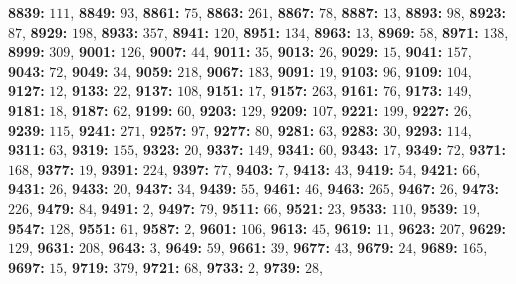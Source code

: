 \textsf{\bfseries 8839:} $111$, \textsf{\bfseries 8849:} $93$, \textsf{\bfseries 8861:} $75$, \textsf{\bfseries 8863:} $261$, \textsf{\bfseries 8867:} $78$, \textsf{\bfseries 8887:} $13$, \textsf{\bfseries 8893:} $98$, \textsf{\bfseries 8923:} $87$, \textsf{\bfseries 8929:} $198$, \textsf{\bfseries 8933:} $357$, \textsf{\bfseries 8941:} $120$, \textsf{\bfseries 8951:} $134$, \textsf{\bfseries 8963:} $13$, \textsf{\bfseries 8969:} $58$, \textsf{\bfseries 8971:} $138$, \textsf{\bfseries 8999:} $309$, \textsf{\bfseries 9001:} $126$, \textsf{\bfseries 9007:} $44$, \textsf{\bfseries 9011:} $35$, \textsf{\bfseries 9013:} $26$, \textsf{\bfseries 9029:} $15$, \textsf{\bfseries 9041:} $157$, \textsf{\bfseries 9043:} $72$, \textsf{\bfseries 9049:} $34$, \textsf{\bfseries 9059:} $218$, \textsf{\bfseries 9067:} $183$, \textsf{\bfseries 9091:} $19$, \textsf{\bfseries 9103:} $96$, \textsf{\bfseries 9109:} $104$, \textsf{\bfseries 9127:} $12$, \textsf{\bfseries 9133:} $22$, \textsf{\bfseries 9137:} $108$, \textsf{\bfseries 9151:} $17$, \textsf{\bfseries 9157:} $263$, \textsf{\bfseries 9161:} $76$, \textsf{\bfseries 9173:} $149$, \textsf{\bfseries 9181:} $18$, \textsf{\bfseries 9187:} $62$, \textsf{\bfseries 9199:} $60$, \textsf{\bfseries 9203:} $129$, \textsf{\bfseries 9209:} $107$, \textsf{\bfseries 9221:} $199$, \textsf{\bfseries 9227:} $26$, \textsf{\bfseries 9239:} $115$, \textsf{\bfseries 9241:} $271$, \textsf{\bfseries 9257:} $97$, \textsf{\bfseries 9277:} $80$, \textsf{\bfseries 9281:} $63$, \textsf{\bfseries 9283:} $30$, \textsf{\bfseries 9293:} $114$, \textsf{\bfseries 9311:} $63$, \textsf{\bfseries 9319:} $155$, \textsf{\bfseries 9323:} $20$, \textsf{\bfseries 9337:} $149$, \textsf{\bfseries 9341:} $60$, \textsf{\bfseries 9343:} $17$, \textsf{\bfseries 9349:} $72$, \textsf{\bfseries 9371:} $168$, \textsf{\bfseries 9377:} $19$, \textsf{\bfseries 9391:} $224$, \textsf{\bfseries 9397:} $77$, \textsf{\bfseries 9403:} $7$, \textsf{\bfseries 9413:} $43$, \textsf{\bfseries 9419:} $54$, \textsf{\bfseries 9421:} $66$, \textsf{\bfseries 9431:} $26$, \textsf{\bfseries 9433:} $20$, \textsf{\bfseries 9437:} $34$, \textsf{\bfseries 9439:} $55$, \textsf{\bfseries 9461:} $46$, \textsf{\bfseries 9463:} $265$, \textsf{\bfseries 9467:} $26$, \textsf{\bfseries 9473:} $226$, \textsf{\bfseries 9479:} $84$, \textsf{\bfseries 9491:} $2$, \textsf{\bfseries 9497:} $79$, \textsf{\bfseries 9511:} $66$, \textsf{\bfseries 9521:} $23$, \textsf{\bfseries 9533:} $110$, \textsf{\bfseries 9539:} $19$, \textsf{\bfseries 9547:} $128$, \textsf{\bfseries 9551:} $61$, \textsf{\bfseries 9587:} $2$, \textsf{\bfseries 9601:} $106$, \textsf{\bfseries 9613:} $45$, \textsf{\bfseries 9619:} $11$, \textsf{\bfseries 9623:} $207$, \textsf{\bfseries 9629:} $129$, \textsf{\bfseries 9631:} $208$, \textsf{\bfseries 9643:} $3$, \textsf{\bfseries 9649:} $59$, \textsf{\bfseries 9661:} $39$, \textsf{\bfseries 9677:} $43$, \textsf{\bfseries 9679:} $24$, \textsf{\bfseries 9689:} $165$, \textsf{\bfseries 9697:} $15$, \textsf{\bfseries 9719:} $379$, \textsf{\bfseries 9721:} $68$, \textsf{\bfseries 9733:} $2$, \textsf{\bfseries 9739:} $28$, 
